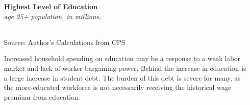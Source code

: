 \documentclass{report}
\newcommand{\tbllink}[1]{\href{https://raw.githubusercontent.com/bdecon/US-chartbook/master/chartbook/data/#1}{\faTable}}
\newcommand{\barylab}[2]{yticklabel style={text width=#1, align=right, 
		style={black!70}, text height=#2},}
\newcommand{\bbar}[2]{extra #1 ticks = {{#2}}, extra #1 tick labels = ,
		extra #1 tick style = {grid=major, grid style={thick, black!25}},}
\newcommand{\barplotnogrid}{xbar=0pt, axis line style={draw=none},
	    yticklabel style={align=left, anchor=east},
      		xmajorticks=false, ymajorgrids=false,   
	    ytick=data, tickwidth=0pt, area legend, reverse legend,
	    nodes near coords align={horizontal},}
\begin{document}
{\begin{minipage}{0.33\textwidth}
\small  
\end{minipage}\hspace{6mm}
\begin{minipage}{0.39\textwidth}
\normalsize \textbf{Highest Level of Education}\\
\footnotesize{\textit{age 25+ population, in millions, }}\\
\hspace*{-4mm} \\
\footnotesize{Source: Author's Calculations from CPS} \hfill \tbllink{cps_educ_tot.csv}
\end{minipage}
\vspace{1mm}

\begin{minipage}{0.76\textwidth}
\small 

Increased household spending on education may be a response to a weak labor market and lack of worker bargaining power. Behind the increase in education is a large increase in student debt. The burden of this debt is severe for many, as the more-educated workforce is not necessarily receiving the historical wage premium from education. 
\vspace{2mm}


\end{minipage}}
\end{document}
